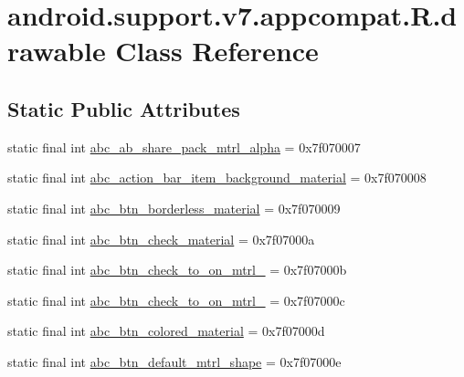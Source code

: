 \hypertarget{classandroid_1_1support_1_1v7_1_1appcompat_1_1R_1_1drawable}{}\section{android.\+support.\+v7.\+appcompat.\+R.\+drawable Class Reference}
\label{classandroid_1_1support_1_1v7_1_1appcompat_1_1R_1_1drawable}
\subsection*{Static Public Attributes}
\begin{DoxyCompactItemize}
\item 
static final int \mbox{\hyperlink{classandroid_1_1support_1_1v7_1_1appcompat_1_1R_1_1drawable_a2617cd3cc5fd99bf8702673e973c716d}{abc\+\_\+ab\+\_\+share\+\_\+pack\+\_\+mtrl\+\_\+alpha}} = 0x7f070007
\item 
static final int \mbox{\hyperlink{classandroid_1_1support_1_1v7_1_1appcompat_1_1R_1_1drawable_a48cb66511eb88f80686a25611e677bd3}{abc\+\_\+action\+\_\+bar\+\_\+item\+\_\+background\+\_\+material}} = 0x7f070008
\item 
static final int \mbox{\hyperlink{classandroid_1_1support_1_1v7_1_1appcompat_1_1R_1_1drawable_ad3b42c47b3c3ed014fd375136c62b76b}{abc\+\_\+btn\+\_\+borderless\+\_\+material}} = 0x7f070009
\item 
static final int \mbox{\hyperlink{classandroid_1_1support_1_1v7_1_1appcompat_1_1R_1_1drawable_ad54104f0bfce1e7c5fa5f887c153557a}{abc\+\_\+btn\+\_\+check\+\_\+material}} = 0x7f07000a
\item 
static final int \mbox{\hyperlink{classandroid_1_1support_1_1v7_1_1appcompat_1_1R_1_1drawable_a45c3ee07ad24f689749d83dccb1efe64}{abc\+\_\+btn\+\_\+check\+\_\+to\+\_\+on\+\_\+mtrl\+\_}} = 0x7f07000b
\item 
static final int \mbox{\hyperlink{classandroid_1_1support_1_1v7_1_1appcompat_1_1R_1_1drawable_aa0d4e39356c8f7a8c87c6c74809e1e06}{abc\+\_\+btn\+\_\+check\+\_\+to\+\_\+on\+\_\+mtrl\+\_}} = 0x7f07000c
\item 
static final int \mbox{\hyperlink{classandroid_1_1support_1_1v7_1_1appcompat_1_1R_1_1drawable_aedfa71414c1ad5fbc62fef5c218ff93c}{abc\+\_\+btn\+\_\+colored\+\_\+material}} = 0x7f07000d
\item 
static final int \mbox{\hyperlink{classandroid_1_1support_1_1v7_1_1appcompat_1_1R_1_1drawable_a498dee9d40c49a9928e85e8005f6f642}{abc\+\_\+btn\+\_\+default\+\_\+mtrl\+\_\+shape}} = 0x7f07000e

\end{DoxyCompactItemize}
